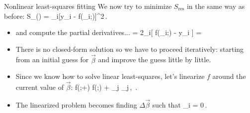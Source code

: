 \documentclass[10pt,aspectratio=169,handout]{beamer}
\begin{document}
\begin{frame}{Nonlinear least-squares fitting}
We now try to minimize $S_\mathrm{res}$ in the same way as before:
	\bea
		S_{}(\vec{\beta}) = \sum_i[y_i - f(_i;\vec{\beta})]^2\,.
	\eea
	\vspace{-0.5cm}\pause
	\begin{itemize}[<+->]
	\item and compute the partial derivatives...
	\bea
		 = 2\sum_i[ f(_i;\vec{\beta}) - y_i ] =  \vec{\beta} 
	\eea
	\item There is no closed-form solution so we have to proceed iteratively: starting from an initial guess for $\vec{\beta}$ and improve the guess little by little.
	\item Since we know how to solve linear least-squares, let's linearize $f$ around the current value of $\vec{\beta}$:
	\bea
		f(;\vec{\beta}+\Delta\vec{\beta}) \simeq f(;\vec{\beta}) + \sum_j  \Delta\beta_j\,,\quad {} \Delta\vec{\beta}\,.
	\eea
	\item The linearized problem becomes finding $\Delta\vec{\beta}$ such that
	\bea
		\sum_i = 0\,.
	\eea
	
\end{itemize}
\end{frame}
\end{document}
